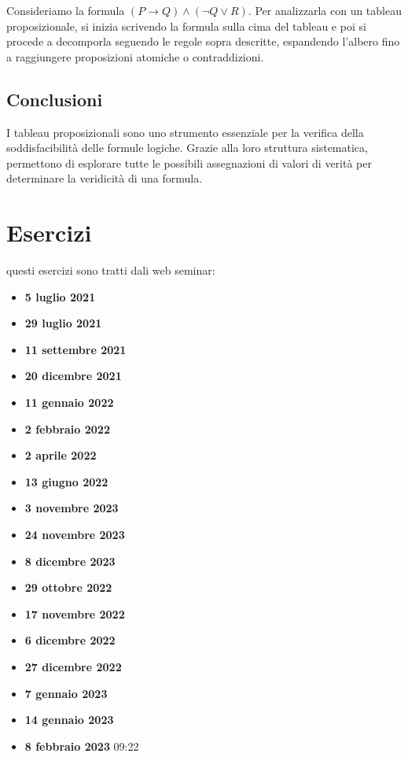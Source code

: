 \documentclass{article}
\begin{document}
Consideriamo la formula $(P \to Q) \land (\neg Q \lor R)$. Per analizzarla con un tableau proposizionale, si inizia scrivendo la formula sulla cima del tableau e poi si procede a decomporla seguendo le regole sopra descritte, espandendo l'albero fino a raggiungere proposizioni atomiche o contraddizioni.

\subsection{Conclusioni}

I tableau proposizionali sono uno strumento essenziale per la verifica della soddisfacibilità delle formule logiche. Grazie alla loro struttura sistematica, permettono di esplorare tutte le possibili assegnazioni di valori di verità per determinare la veridicità di una formula.

\newpage
\section{Esercizi}
questi esercizi sono tratti dali web seminar:
\begin{itemize}
    \item \textbf{5 luglio 2021}
    \item \textbf{29 luglio 2021}
    \item \textbf{11 settembre 2021}
    \item \textbf{20 dicembre 2021}
    \item \textbf{11 gennaio 2022}
    \item \textbf{2 febbraio 2022}
    \item \textbf{2 aprile 2022}
    \item \textbf{13 giugno 2022}
    \item \textbf{3 novembre 2023}
    \item \textbf{24 novembre 2023}
    \item \textbf{8 dicembre 2023}
    \item \textbf{29 ottobre 2022}
    \item \textbf{17 novembre 2022}    
    \item \textbf{6 dicembre 2022}
    \item \textbf{27 dicembre 2022}
    \item \textbf{7 gennaio 2023}
    \item \textbf{14 gennaio 2023}
    \item \textbf{8 febbraio 2023} 09:22
\end{itemize}
\end{document}
